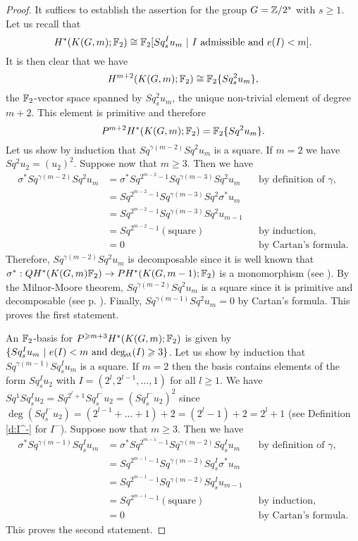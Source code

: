 \begin{proof} %
It suffices to establish the assertion for the group $G=\mathbb{Z}/2^s$ with $s\geq1$. Let us recall that
$$
H^*(K(G,m);\F_2)\cong\F_2[Sq^I_s u_m\ |\ \text{$I$ admissible and $e(I)<m$}].
$$ It is then clear that we have
$$
H^{m+2}(K(G,m);\mathbb{F}_2)\cong\mathbb{F}_2\{Sq^2_s u_m\},
$$ the $\mathbb{F}_2$-vector space spanned by $Sq^2_s u_m$, the unique non-trivial element of degree $m+2$. This element is primitive and therefore 
$$P^{m+2}H^*(K(G,m);\mathbb{F}_2)=\mathbb{F}_2\{Sq^2u_m\}.$$ Let us show by induction that $Sq^{\gamma(m-2)}Sq^2u_m$ is a square. If $m=2$ we have $Sq^2u_2=(u_2)^2$. Suppose now that $m\geq3$. Then we have
\begin{align*}
\sigma^*Sq^{\gamma(m-2)}Sq^2u_m&=\sigma^*Sq^{2^{m-2}-1}Sq^{\gamma(m-3)}Sq^2u_m &&\text{by definition of $\gamma$,}\\
&=Sq^{2^{m-2}-1}Sq^{\gamma(m-3)}Sq^2\sigma^*u_{m}\\
&=Sq^{2^{m-2}-1}Sq^{\gamma(m-3)}Sq^2u_{m-1}\\
&=Sq^{2^{m-2}-1}(\text{square}) &&\text{by induction,}\\
&=0 &&\text{by Cartan's formula.}
\end{align*}
Therefore, $Sq^{\gamma(m-2)}Sq^2u_m$ is decomposable since it is well known that $\sigma^*:QH^*(K(G,m)\mathbb{F}_2)\to PH^*(K(G,m-1);\mathbb{F}_2)$ is a monomorphism (see \cite[Expos\'e 15, Proposition 3, p. 8]{Ca55}). By the Milnor-Moore theorem, $Sq^{\gamma(m-2)}Sq^2u_m$ is a square since it is primitive and decomposable (see p. \pageref{t:Milnor-Moore}). Finally, $Sq^{\gamma(m-1)}Sq^2u_m=0$ by Cartan's formula. This proves the first statement.

An $\mathbb{F}_2$-basis for $P^{\geqslant m+3}H^*(K(G,m);\mathbb{F}_2)$ is given by $\{Sq^I_s u_m\ |\ \text{$e(I)<m$ and $\operatorname{deg_{st}}(I)\geqslant3$}\}$. Let us show by induction that $Sq^{\gamma(m-1)}Sq^I_s u_m$ is a square. If $m=2$ then the basis contains elements of the form $Sq^I_s u_2$ with $I=(2^l,2^{l-1},\dots,1)$ for all $l\geq1$. We have $Sq^1Sq^I_s u_2=Sq^{2^l+1}Sq^{I^-}_s u_2=(Sq^{I^-}_s u_2)^2$ since $\deg(Sq^{I^-}_s u_2)=(2^{l-1}+\dots+1)+2=(2^l-1)+2=2^l+1$ (see Definition \ref{d:I^-} for $I^-$). Suppose now that $m\geq3$. Then we have
\begin{align*}
\sigma^*Sq^{\gamma(m-1)}Sq^I_s u_m&=\sigma^*Sq^{2^{m-1}-1}Sq^{\gamma(m-2)}Sq^I_s u_m &&\text{by definition of $\gamma$,}\\
&=Sq^{2^{m-1}-1}Sq^{\gamma(m-2)}Sq^I_s \sigma^*u_{m}\\
&=Sq^{2^{m-1}-1}Sq^{\gamma(m-2)}Sq^I_s u_{m-1}\\
&=Sq^{2^{m-1}-1}(\text{square}) &&\text{by induction,}\\
&=0 &&\text{by Cartan's formula.}
\end{align*}
This proves the second statement.
\end{proof}

